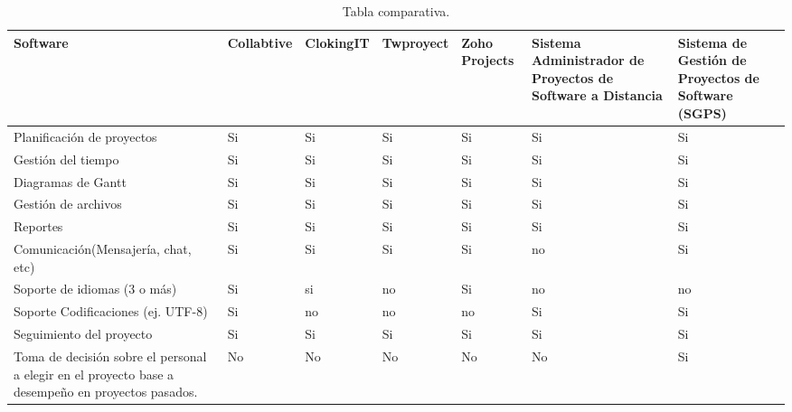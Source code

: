 \begin{table}[htbp]
\begin{center}
\begin{tabular}{|p{70mm}|p{15mm}|p{15mm} |p{15mm}|p{15mm}|p{15mm}|p{15mm}|}
\hline
Software & Collabtive & ClokingIT & Twproyect & Zoho Projects & Sistema Administrador de Proyectos de Software a Distancia & Sistema de Gestión de Proyectos de Software (SGPS) 
\\
\hline \hline
Planificación de proyectos &  Si &  Si  &  Si  &  Si &  Si &  Si

\\ \hline
Gestión del tiempo & Si &  Si  &  Si  &  Si &  Si &  Si

\\ \hline
Diagramas de Gantt & Si &  Si  &  Si  &  Si &  Si &  Si

\\ \hline
Gestión de archivos & Si &  Si  &  Si  &  Si &  Si &  Si

\\ \hline
Reportes  & Si &  Si  &  Si  &  Si &  Si &  Si

\\ \hline
Comunicación(Mensajería, chat, etc)  & Si &  Si  &  Si  &  Si &  no &  Si

\\ \hline
Soporte de idiomas (3 o más)  & Si &  si  &  no  &  Si &  no &  no
\\ \hline

Soporte Codificaciones (ej. UTF-8)  & Si &  no  &  no  &  no &  Si &  Si
\\ \hline

Seguimiento del proyecto   & Si &  Si  &  Si  &  Si &  Si &  Si
\\ \hline

Toma de decisión sobre el personal a
elegir en el proyecto
base a desempeño
en proyectos pasados.    & No &  No  &  No  &  No &  No &  Si
\\ \hline

\end{tabular}
\caption{Tabla comparativa.}
\label{tabla:comparativa}
\end{center}
\end{table}


	